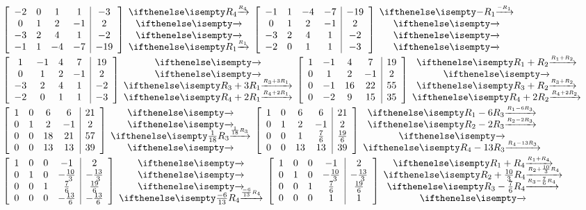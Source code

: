 \documentclass[
  letterpaper,
  DIV=11,
  numbers=noendperiod]{scrartcl}
\begin{document}

\begin{align*}
&\left[\begin{array}{cccc|c}-2 & 0 & 1 & 1 & -3 \\ 0 & 1 & 2 & -1 & 2 \\ -3 & 2 & 4 & 1 & -2 \\ -1 & 1 & -4 & -7 & -19\end{array}\right]\rowops{R_4,,,R_1}\left[\begin{array}{cccc|c} -1 & 1 & -4 & -7 & -19 \\ 0 & 1 & 2 & -1 & 2 \\ -3 & 2 & 4 & 1 & -2 \\ -2 & 0 & 1 & 1 & -3\end{array}\right]\rowops{-R_1,,,} \\
&\left[\begin{array}{cccc|c} 1 & -1 & 4 & 7 & 19 \\  0 & 1 & 2 & -1 & 2 \\ -3 & 2 & 4 & 1 & -2 \\ -2 & 0 & 1 & 1 & -3\end{array}\right]\rowops{,,R_3+3R_1,R_4+2R_1}\left[\begin{array}{cccc|c} 1 & -1 & 4 & 7 & 19 \\ 0 & 1 & 2 & -1 & 2 \\ 0 & -1 & 16 & 22 & 55 \\ 0 & -2 & 9 & 15 & 35\end{array}\right]\rowops{R_1+R_2,,R_3+R_2,R_4+2R_2} \\
&\left[\begin{array}{cccc|c}1 & 0 & 6 & 6 & 21 \\ 0 & 1 & 2 & -1 & 2 \\ 0 & 0 & 18 & 21 & 57 \\ 0 & 0 & 13 & 13 & 39 \end{array}\right]\rowops{,,\frac{1}{18}R_3,}\left[\begin{array}{cccc|c}1 & 0 & 6 & 6 & 21 \\ 0 & 1 & 2 & -1 & 2 \\ 0 & 0 & 1 & \frac{7}{6} & \frac{19}{6} \\ 0 & 0 & 13 & 13 & 39 \end{array}\right]\rowops{R_1-6R_3,R_2-2R_3,,R_4-13R_3} \\
&\left[\begin{array}{cccc|c}1 & 0 & 0 & -1 & 2 \\ 0 & 1 & 0 & -\frac{10}{3} & -\frac{13}{3} \\ 0 & 0 & 1 & \frac{7}{6} & \frac{19}{6} \\ 0 & 0 & 0 & -\frac{13}{6} & -\frac{13}{6} \end{array}\right]\rowops{,,,\frac{-6}{13}R_4}\left[\begin{array}{cccc|c}1 & 0 & 0 & -1 & 2 \\ 0 & 1 & 0 & -\frac{10}{3} & -\frac{13}{3} \\ 0 & 0 & 1 & \frac{7}{6} & \frac{19}{6} \\ 0 & 0 & 0 & 1 & 1 \end{array}\right]\rowops{R_1+R_4,R_2+\frac{10}{3}R_4,R_3-\frac{7}{6}R_4,} \\

\end{align*}
\end{document}
